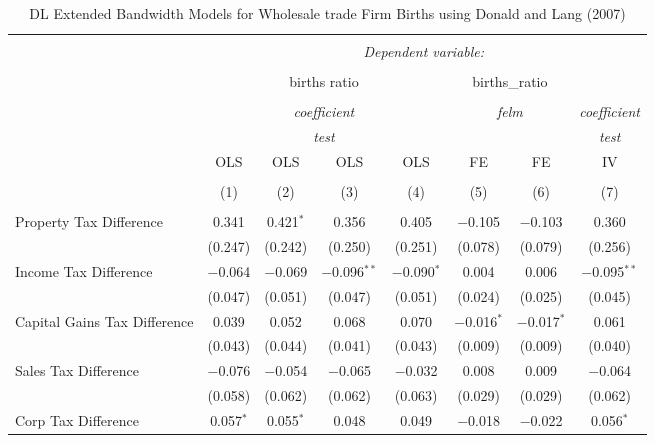 
\begin{table}[!htbp] \centering 
  \caption{DL Extended Bandwidth Models for  Wholesale trade Firm Births using Donald and Lang (2007)} 
  \label{} 
\begin{tabular}{@{\extracolsep{5pt}}lccccccc} 
\\[-1.8ex]\hline 
\hline \\[-1.8ex] 
 & \multicolumn{7}{c}{\textit{Dependent variable:}} \\ 
\cline{2-8} 
\\[-1.8ex] & \multicolumn{4}{c}{births ratio} & \multicolumn{2}{c}{births\_ratio} &   \\ 
\\[-1.8ex] & \multicolumn{4}{c}{\textit{coefficient}} & \multicolumn{2}{c}{\textit{felm}} & \textit{coefficient} \\ 
 & \multicolumn{4}{c}{\textit{test}} & \multicolumn{2}{c}{\textit{}} & \textit{test} \\ 
 & OLS & OLS & OLS & OLS & FE & FE & IV \\ 
\\[-1.8ex] & (1) & (2) & (3) & (4) & (5) & (6) & (7)\\ 
\hline \\[-1.8ex] 
 Property Tax Difference & 0.341 & 0.421$^{*}$ & 0.356 & 0.405 & $-$0.105 & $-$0.103 & 0.360 \\ 
  & (0.247) & (0.242) & (0.250) & (0.251) & (0.078) & (0.079) & (0.256) \\ 
  Income Tax Difference & $-$0.064 & $-$0.069 & $-$0.096$^{**}$ & $-$0.090$^{*}$ & 0.004 & 0.006 & $-$0.095$^{**}$ \\ 
  & (0.047) & (0.051) & (0.047) & (0.051) & (0.024) & (0.025) & (0.045) \\ 
  Capital Gains Tax Difference & 0.039 & 0.052 & 0.068 & 0.070 & $-$0.016$^{*}$ & $-$0.017$^{*}$ & 0.061 \\ 
  & (0.043) & (0.044) & (0.041) & (0.043) & (0.009) & (0.009) & (0.040) \\ 
  Sales Tax Difference & $-$0.076 & $-$0.054 & $-$0.065 & $-$0.032 & 0.008 & 0.009 & $-$0.064 \\ 
  & (0.058) & (0.062) & (0.062) & (0.063) & (0.029) & (0.029) & (0.062) \\ 
  Corp Tax Difference & 0.057$^{*}$ & 0.055$^{*}$ & 0.048 & 0.049 & $-$0.018 & $-$0.022 & 0.056$^{*}$ \\ 

\end{tabular}
\end{table}
